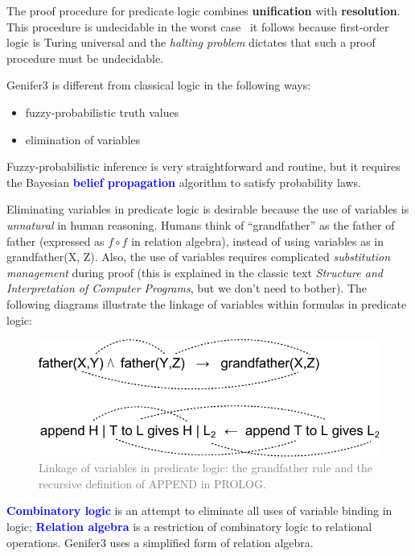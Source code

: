 \documentclass[12pt]{article}
\newcommand{\concept}[1]{\textbf{\textcolor{blue}{#1}}}
\newcommand{\formula}[1]{\ttfamily\textcolor{LogicColor}{#1}\rmfamily}
\begin{document}
The proof procedure for predicate logic combines \textbf{unification} with \textbf{resolution}.  This procedure is undecidable in the worst case \textemdash \, it follows because first-order logic is Turing universal and the \textit{halting problem} dictates that such a proof procedure must be undecidable.

Genifer3 is different from classical logic in the following ways:
\begin{itemize}
\item fuzzy-probabilistic truth values
\item elimination of variables
\end{itemize}

Fuzzy-probabilistic inference is very straightforward and routine, but it requires the Bayesian \concept{belief propagation} algorithm to satisfy probability laws.

Eliminating variables in predicate logic is desirable because the use of variables is \textit{unnatural} in human reasoning.  Humans think of ``grandfather'' as the father of father (expressed as $f \circ f$ in relation algebra), instead of using variables as in \formula{grandfather(X, Z)}.  Also, the use of variables requires complicated \textit{substitution management} during proof (this is explained in the classic text \textit{Structure and Interpretation of Computer Programs}, but we don't need to bother).  The following diagrams illustrate the linkage of variables within formulas in predicate logic:
\begin{figure}[H]
\centering
\includegraphics[scale=0.8]{connections-logic-variables.pdf}
\caption{\textcolor{grey}{Linkage of variables in predicate logic: the grandfather rule and the recursive definition of APPEND in PROLOG.}}
\label{fig:ontology-relations-relations}
\end{figure}

\concept{Combinatory logic} is an attempt to eliminate all uses of variable binding in logic;  \concept{Relation algebra} is a restriction of combinatory logic to relational operations.  Genifer3 uses a simplified form of relation algebra.
\end{document}
